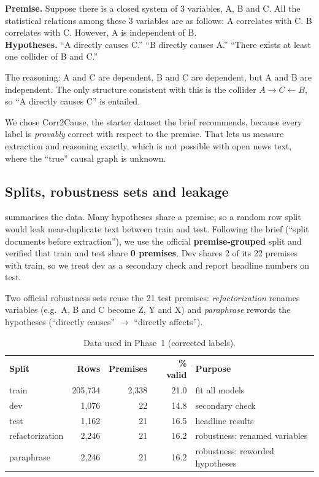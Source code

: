 \documentclass[11pt,a4paper]{article}
\newcommand{\thead}[1]{\leavevmode\sffamily\bfseries\color{white}#1}
\newcommand{\headrow}{\rowcolor{ink}}
\newcommand{\chip}[2]{\tcbox[on line,colback=#1,colframe=#1,coltext=white,arc=2pt,boxsep=0pt,
  left=3pt,right=3pt,top=1.5pt,bottom=1.5pt,fontupper=\sffamily\bfseries\scriptsize]{#2}}
\begin{document}
\begin{examplebox}
\small\textbf{Premise.} Suppose there is a closed system of 3 variables, A, B and C. All the statistical relations
among these 3 variables are as follows: A correlates with C. B correlates with C. However, A is independent of B.\\[0.3em]
\textbf{Hypotheses.} ``A directly causes C.'' \chip{symbolic}{label 1} \quad
``B directly causes A.'' \chip{slate}{label 0} \quad
``There exists at least one collider of B and C.'' \chip{slate}{label 0}
\end{examplebox}

The reasoning: A and C are dependent, B and C are dependent, but A and B are independent. The only structure
consistent with this is the collider $A\rightarrow C\leftarrow B$, so ``A directly causes C'' is entailed.

We chose Corr2Cause, the starter dataset the brief recommends, because every label is
\emph{provably} correct with respect to the premise. That lets us measure extraction and reasoning exactly,
which is not possible with open news text, where the ``true'' causal graph is unknown.

\subsection{Splits, robustness sets and leakage}
 summarises the data. Many hypotheses share a premise, so a random row split would leak
near-duplicate text between train and test. Following the brief (``split documents before extraction''), we
use the official \textbf{premise-grouped} split and verified that train and test share \textbf{0 premises}.
Dev shares 2 of its 22 premises with train, so we treat dev as a secondary check and report headline numbers on test.

Two official robustness sets reuse the 21 test premises: \emph{refactorization} renames variables
(e.g.\ A, B and C become Z, Y and X) and \emph{paraphrase} rewords the hypotheses
(``directly causes'' $\rightarrow$ ``directly affects'').

\begin{table}[!htbp]
\centering\small
\caption{Data used in Phase~1 (corrected labels).}
\label{tab:splits}
\begin{tabular}{@{}lrrrl@{}}
\headrow \thead{Split} & \thead{Rows} & \thead{Premises} & \thead{\% valid} & \thead{Purpose} \\
train            & 205{,}734 & 2{,}338 & 21.0 & fit all models \\
\rowcolor{mist} dev & 1{,}076 & 22 & 14.8 & secondary check \\
test             & 1{,}162 & 21 & 16.5 & headline results \\
\rowcolor{mist} refactorization & 2{,}246 & 21 & 16.2 & robustness: renamed variables \\
paraphrase       & 2{,}246 & 21 & 16.2 & robustness: reworded hypotheses \\
\end{tabular}
\end{table}
\end{document}
